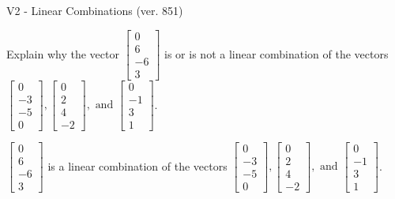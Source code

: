 \begin{exercise}
  \begin{exerciseTitle}V2 - Linear Combinations (ver. 851)\end{exerciseTitle}
  \begin{exerciseStatement}
    Explain why the vector \(\left[\begin{array}{c}
0 \\
6 \\
-6 \\
3
\end{array}\right]\)  is or is not a linear 
	combination of the vectors \(\left[\begin{array}{c}
0 \\
-3 \\
-5 \\
0
\end{array}\right] , \left[\begin{array}{c}
0 \\
2 \\
4 \\
-2
\end{array}\right] , \text{ and } \left[\begin{array}{c}
0 \\
-1 \\
3 \\
1
\end{array}\right]\).
	


  \end{exerciseStatement}
  \begin{exerciseAnswer}
   \(\left[\begin{array}{c}
0 \\
6 \\
-6 \\
3
\end{array}\right]\) 
  	 is  
	a linear combination of the vectors \(\left[\begin{array}{c}
0 \\
-3 \\
-5 \\
0
\end{array}\right] , \left[\begin{array}{c}
0 \\
2 \\
4 \\
-2
\end{array}\right] , \text{ and } \left[\begin{array}{c}
0 \\
-1 \\
3 \\
1
\end{array}\right]\).

	
  


  \end{exerciseAnswer}
\end{exercise}